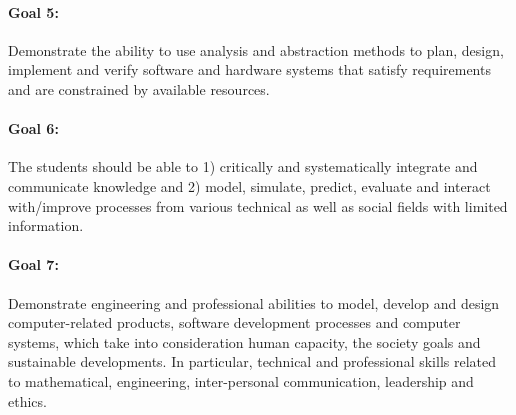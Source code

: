 \paragraph{Goal 5:} Demonstrate the ability to use analysis and
abstraction methods to plan, design, implement and verify software and
hardware systems that satisfy requirements and are constrained by
available resources.

% 
% 
% 
% 

\paragraph{Goal 6:} The students should be able to
%
1) critically and systematically integrate and communicate knowledge
and 
%
2) model, simulate, predict, evaluate and interact with/improve
processes from various technical as well as social fields with limited
information.

% 


% 
% 
% 

\paragraph{Goal 7:} Demonstrate engineering and professional abilities
to model, develop and design computer-related products, software
development processes and computer systems, which take into
consideration human capacity, the society goals and sustainable
developments. In particular, technical and professional skills related
to mathematical, engineering, inter-personal communication, leadership
and ethics.

